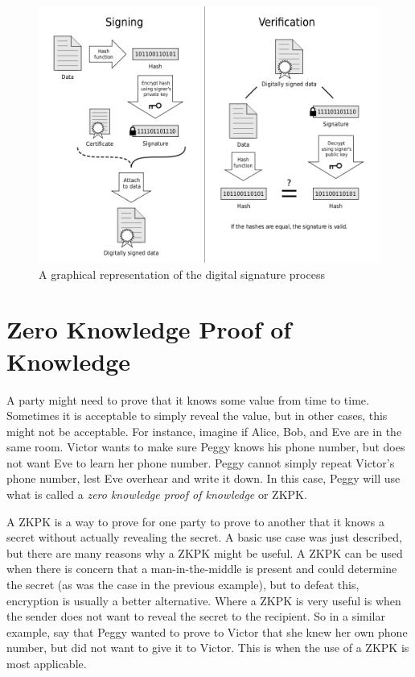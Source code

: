 \begin{figure}[!ht]
\includegraphics[width=500px]{images/signing.png}
\caption{A graphical representation of the digital signature process \cite{signing}}
\label{fig:signing}
\end{figure}


\section{Zero Knowledge Proof of Knowledge}
A party might need to prove that it knows some value from time to time. Sometimes it is acceptable
to simply reveal the value, but in other cases, this might not be acceptable. For instance, imagine
if Alice, Bob, and Eve are in the same room. Victor  wants to make sure Peggy knows his phone number,
but does not want Eve to learn her phone number. Peggy cannot simply repeat Victor's phone
number, lest Eve overhear and write it down. In this case, Peggy will use what is called a
\textit{zero knowledge proof of knowledge} or ZKPK.

A ZKPK is a way to prove for one party to prove to another that it knows a secret without actually
revealing the secret. A basic use case was just described, but there are many reasons why a ZKPK
might be useful. A ZKPK can be used when there is concern that a man-in-the-middle is present
and could determine the secret (as was the case in the previous example), but to defeat this,
encryption is usually a better alternative. Where a ZKPK is very useful is when the sender does not
want to reveal the secret to the recipient. So in a similar example, say that Peggy wanted to prove to
Victor that she knew her own phone number, but did not want to give it to Victor. This is when the
use of a ZKPK is most applicable.

